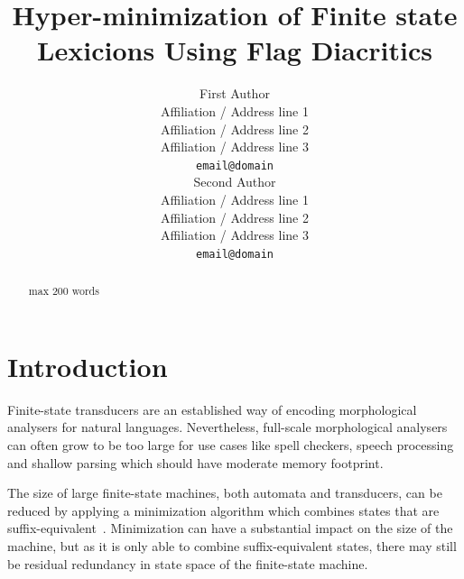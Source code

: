 \documentclass[11pt]{article}
\title{Hyper-minimization of Finite state Lexicions Using Flag Diacritics}
\author{First Author \\
  Affiliation / Address line 1 \\
  Affiliation / Address line 2 \\
  Affiliation / Address line 3 \\
  {\tt email@domain} \\\And
  Second Author \\
  Affiliation / Address line 1 \\
  Affiliation / Address line 2 \\
  Affiliation / Address line 3 \\
  {\tt email@domain} \\}
\date{}
\begin{document}
\maketitle
\begin{abstract}
  max 200 words
\end{abstract}




\section{Introduction}
%
% 

Finite-state transducers are an established way of encoding
morphological analysers for natural languages. Nevertheless,
full-scale morphological analysers can often grow to be too large for
use cases like spell checkers, speech processing and shallow parsing
which should have moderate memory footprint.

The size of large finite-state machines, both automata and
transducers, can be reduced by applying a minimization algorithm which
combines states that are
suffix-equivalent~\cite{Aho1986}. Minimization can have a substantial
impact on the size of the machine, but as it is only able to combine
suffix-equivalent states, there may still be residual redundancy in
state space of the finite-state machine.
\end{document}
